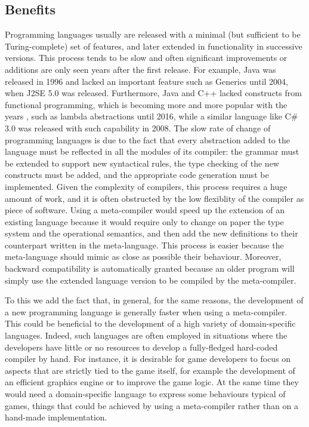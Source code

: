 \subsection{Benefits}
\label{sec:ch1_benefits}
Programming languages usually are released with a minimal (but sufficient to be Turing-complete) set of features, and later extended in functionality in successive versions. This process tends to be slow and often significant improvements or additions are only seen years after the first release. For example, Java was released in 1996 and lacked an important feature such as Generics until 2004, when J2SE 5.0 was released. Furthermore, Java and C++ lacked constructs from functional programming, which is becoming more and more popular with the years \cite{thompson1995miranda}, such as lambda abstractions until 2016, while a similar language like C\# 3.0 was released with such capability in 2008. The slow rate of change of programming languages is due to the fact that every abstraction added to the language must be reflected in all the modules of its compiler: the grammar must be extended to support new syntactical rules, the type checking of the new constructs must be added, and the appropriate code generation must be implemented. Given the complexity of compilers, this process requires a huge amount of work, and it is often obstructed by the low flexiblity of the compiler as piece of software. Using a meta-compiler would speed up the extension of an existing language because it would require only to change on paper the type system and the operational semantics, and then add the new definitions to their counterpart written in the meta-language. This process is easier because the meta-language should mimic as close as possible their behaviour. Moreover, backward compatibility is automatically granted because an older program will simply use the extended language version to be compiled by the meta-compiler.

To this we add the fact that, in general, for the same reasons, the development of a new programming language is generally faster when using a meta-compiler. This could be beneficial to the development of a high variety of domain-specific languages. Indeed, such languages are often employed in situations where the developers have little or no resources to develop a fully-fledged hard-coded compiler by hand. For instance, it is desirable for game developers to focus on aspects that are strictly tied to the game itself, for example the development of an efficient graphics engine or to improve the game logic. At the same time they would need a domain-specific language to express some behaviours typical of games, things that could be achieved by using a meta-compiler rather than on a hand-made implementation.

